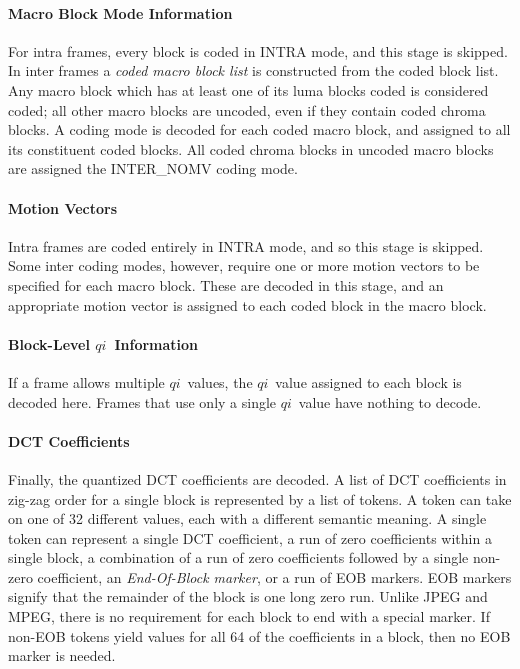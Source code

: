 \documentclass[11pt,letterpaper]{book}
\newcommand{\idx}[1]{{\ensuremath{\mathit{#1}}}}
\newcommand{\qi}{\idx{qi}}
\newcommand{\term}[1]{{\em #1}}
\numberwithin{equation}{chapter}
\numberwithin{figure}{chapter}
\numberwithin{table}{chapter}
\begin{document}
\paragraph{Macro Block Mode Information}

For intra frames, every block is coded in INTRA mode, and this stage is
 skipped.
In inter frames a \term{coded macro block list} is constructed from the coded
 block list.
Any macro block which has at least one of its luma blocks coded is considered
 coded; all other macro blocks are uncoded, even if they contain coded chroma
 blocks.
A coding mode is decoded for each coded macro block, and assigned to all its
 constituent coded blocks.
All coded chroma blocks in uncoded macro blocks are assigned the INTER\_NOMV
 coding mode.

\paragraph{Motion Vectors}

Intra frames are coded entirely in INTRA mode, and so this stage is skipped.
Some inter coding modes, however, require one or more motion vectors to be
 specified for each macro block.
These are decoded in this stage, and an appropriate motion vector is assigned
 to each coded block in the macro block.

\paragraph{Block-Level \qi\ Information}

If a frame allows multiple \qi\ values, the \qi\ value assigned to each block
 is decoded here.
Frames that use only a single \qi\ value have nothing to decode.

\paragraph{DCT Coefficients}

Finally, the quantized DCT coefficients are decoded.
A list of DCT coefficients in zig-zag order for a single block is represented
 by a list of tokens.
A token can take on one of 32 different values, each with a different semantic
 meaning.
A single token can represent a single DCT coefficient, a run of zero
 coefficients within a single block, a combination of a run of zero
 coefficients followed by a single non-zero coefficient, an
 \term{End-Of-Block marker}, or a run of EOB markers.
EOB markers signify that the remainder of the block is one long zero run.
Unlike JPEG and MPEG, there is no requirement for each block to end with 
 a special marker.
If non-EOB tokens yield values for all 64 of the coefficients in a block, then
 no EOB marker is needed.
\end{document}
